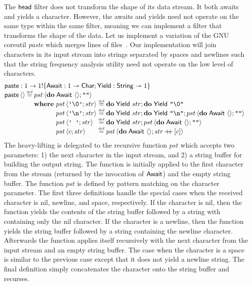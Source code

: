 \documentclass[12pt,phd,lfcs,twoside,openright,logo,leftchapter,normalheadings]{infthesis}
\theoremstyle{plain}
\theoremstyle{definition}
\begin{document}
The $\mathsf{head}$ filter does not transform the shape of its data stream. It
both awaits and yields a character. However, the awaits and yields
need not operate on the same type within the same filter, meaning we
can implement a filter that transforms the shape of the data. Let us
implement a variation of the GNU coreutil \emph{paste} which merges
lines of files~\cite[Section~8.2]{MacKenzieMPPBYS20}. Our
implementation will join characters in its input stream into strings
separated by spaces and newlines such that the string frequency
analysis utility need not operate on the low level of characters.
%
\[
  \bl
    \paste : \UnitType \to \UnitType \eff \{\Await : \UnitType \opto \Char;\Yield : \String \opto \UnitType\}\\
    \paste\,\Unit \defas
      \bl
        pst\,\Record{\Do\;\Await~\Unit;\strlit{}}\\
        \where
          \ba[t]{@{~}l@{~}c@{~}l}
             pst\,\Record{\charlit{\textnil};str} &\defas& \Do\;\Yield~str;\Do\;\Yield~\strlit{\textnil}\\
             pst\,\Record{\charlit{\nl};str} &\defas& \Do\;\Yield~str;\Do\;\Yield~\strlit{\nl};pst\,\Record{\Do\;\Await~\Unit;\strlit{}}\\
             pst\,\Record{\charlit{~};str} &\defas& \Do\;\Yield~str;pst\,\Record{\Do\;\Await~\Unit;\strlit{}}\\
             pst\,\Record{c;str} &\defas& pst\,\Record{\Do\;\Await~\Unit;str \concat [c]}

          \ea
      \el
  \el
\]
%
The heavy-lifting is delegated to the recursive function $pst$
which accepts two parameters: 1) the next character in the input
stream, and 2) a string buffer for building the output string. The
function is initially applied to the first character from the stream
(returned by the invocation of $\mathsf{Await}$) and the empty string
buffer. The function $pst$ is defined by pattern matching on the
character parameter. The first three definitions handle the special
cases when the received character is nil, newline, and space,
respectively. If the character is nil, then the function yields the
contents of the string buffer followed by a string with containing
only the nil character. If the character is a newline, then the
function yields the string buffer followed by a string containing the
newline character. Afterwards the function applies itself recursively
with the next character from the input stream and an empty string
buffer. The case when the character is a space is similar to the
previous case except that it does not yield a newline string. The
final definition simply concatenates the character onto the string
buffer and recurses.
\end{document}
